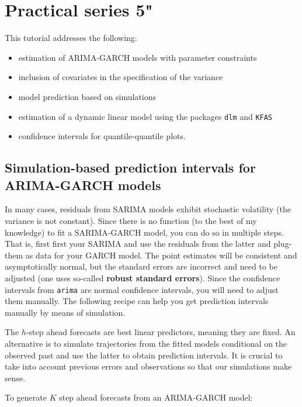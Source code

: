 \documentclass[]{book}
\providecommand{\tightlist}{%
  \setlength{\itemsep}{0pt}\setlength{\parskip}{0pt}}
\begin{document}
\chapter{Practical series 5"}\label{practical-series-5}

This tutorial addresses the following:

\begin{itemize}
\tightlist
\item
  estimation of ARIMA-GARCH models with parameter constraints
\item
  inclusion of covariates in the specification of the variance
\item
  model prediction based on simulations
\item
  estimation of a dynamic linear model using the packages \texttt{dlm}
  and \texttt{KFAS}
\item
  confidence intervals for quantile-quantile plots.
\end{itemize}

\section{Simulation-based prediction intervals for ARIMA-GARCH
models}\label{simulation-based-prediction-intervals-for-arima-garch-models}

In many cases, residuals from SARIMA models exhibit stochastic
volatility (the variance is not constant). Since there is no function
(to the best of my knowledge) to fit a SARIMA-GARCH model, you can do so
in multiple steps. That is, first first your SARIMA and use the
residuals from the latter and plug-them as data for your GARCH model.
The point estimates will be consistent and asymptotically normal, but
the standard errors are incorrect and need to be adjusted (one uses
so-called \textbf{robust standard errors}). Since the confidence
intervals from \texttt{arima} are normal confidence intervals, you will
need to adjust them manually. The following recipe can help you get
prediction intervals manually by means of simulation.

The \(h\)-step ahead forecasts are best linear predictors, meaning they
are fixed. An alternative is to simulate trajectories from the fitted
models conditional on the observed past and use the latter to obtain
prediction intervals. It is crucial to take into account previous errors
and observations so that our simulations make sense.

To generate \(K\) step ahead forecasts from an ARIMA-GARCH model:
\end{document}
